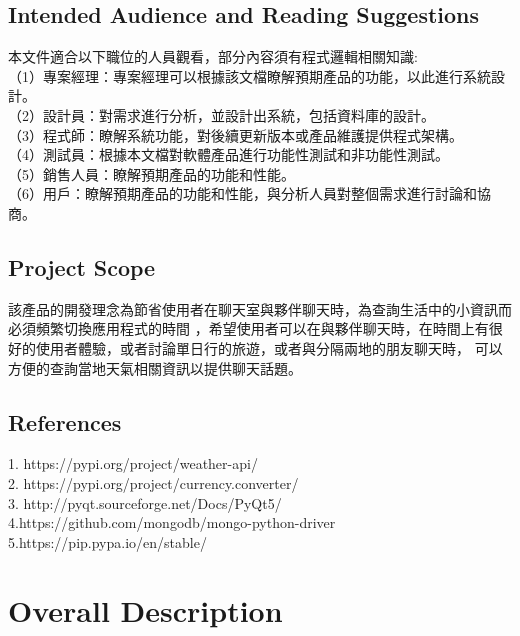 \documentclass{scrreprt}
\begin{document}
\begin{CJK}{UTF8}{bkai}
\section{Intended Audience and Reading Suggestions}
本文件適合以下職位的人員觀看，部分內容須有程式邏輯相關知識: \\
（1）專案經理：專案經理可以根據該文檔瞭解預期產品的功能，以此進行系統設計。 \\
（2）設計員：對需求進行分析，並設計出系統，包括資料庫的設計。 \\
（3）程式師：瞭解系統功能，對後續更新版本或產品維護提供程式架構。 \\
（4）測試員：根據本文檔對軟體產品進行功能性測試和非功能性測試。 \\
（5）銷售人員：瞭解預期產品的功能和性能。 \\
（6）用戶：瞭解預期產品的功能和性能，與分析人員對整個需求進行討論和協商。 \\


\section{Project Scope}
該產品的開發理念為節省使用者在聊天室與夥伴聊天時，為查詢生活中的小資訊而必須頻繁切換應用程式的時間
，希望使用者可以在與夥伴聊天時，在時間上有很好的使用者體驗，或者討論單日行的旅遊，或者與分隔兩地的朋友聊天時，
可以方便的查詢當地天氣相關資訊以提供聊天話題。

\section{References}
1. https://pypi.org/project/weather-api/ \\
2. https://pypi.org/project/currency.converter/ \\
3. http://pyqt.sourceforge.net/Docs/PyQt5/ \\
4.https://github.com/mongodb/mongo-python-driver\\
5.https://pip.pypa.io/en/stable/\\




\chapter{Overall Description}


\end{CJK}
\end{document}
